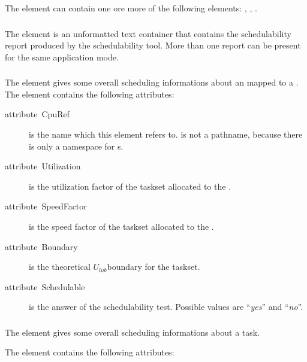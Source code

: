The  element can contain one ore more of the
following elements: , ,
.


\subsubsection{}

The  element is an unformatted text container that
contains the schedulability report produced by the schedulability
tool. More than one report can be present for the same application
mode.


\subsubsection{}

The  element gives some overall scheduling
informations about an  mapped to a . The
 element contains the following attributes:

\begin{description}
\item [{attribute~CpuRef}] is the  name which this element
  refers to.  is not a pathname, because there is only a
  namespace for s.
\item [{attribute~Utilization}] is the utilization factor of the
  taskset allocated to the .
\item [{attribute~SpeedFactor}] is the speed factor of the taskset
  allocated to the .
\item [{attribute~Boundary}] is the theoretical $U_{lub}$boundary for
  the taskset.
\item [{attribute~Schedulable}] is the answer of the schedulability
  test.  Possible values are {}``\emph{yes}'' and {}``\emph{no}''.
\end{description}

\subsubsection{}

The  element gives some overall scheduling
informations about a task.

The  element contains the following attributes:

